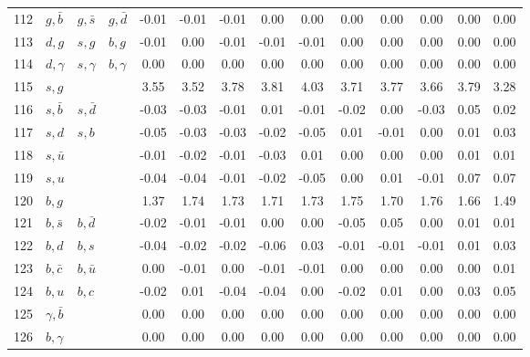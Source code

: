 \begin{tabularx}{\textwidth}{rXXX@{}S@{}S@{}S@{}S@{}S@{}S@{}S@{}S@{}S@{}S}
112 & $g, \bar b$      & $g, \bar s$       & $g, \bar d$      & -0.01 & -0.01 & -0.01 &  0.00 &  0.00 &  0.00 &  0.00 &  0.00 &  0.00 &  0.00 \\
113 & $d, g$           & $s,  g$           & $b,  g$          & -0.01 &  0.00 & -0.01 & -0.01 & -0.01 &  0.00 &  0.00 &  0.00 &  0.00 &  0.00 \\
114 & $d, \gamma$      & $s, \gamma$       & $b, \gamma$      &  0.00 &  0.00 &  0.00 &  0.00 &  0.00 &  0.00 &  0.00 &  0.00 &  0.00 &  0.00 \\
115 & $s, g$           &                   &                  &  3.55 &  3.52 &  3.78 &  3.81 &  4.03 &  3.71 &  3.77 &  3.66 &  3.79 &  3.28 \\
116 & $s, \bar b$      & $s, \bar d$       &                  & -0.03 & -0.03 & -0.01 &  0.01 & -0.01 & -0.02 &  0.00 & -0.03 &  0.05 &  0.02 \\
117 & $s, d$           & $s,  b$           &                  & -0.05 & -0.03 & -0.03 & -0.02 & -0.05 &  0.01 & -0.01 &  0.00 &  0.01 &  0.03 \\
118 & $s, \bar u$      &                   &                  & -0.01 & -0.02 & -0.01 & -0.03 &  0.01 &  0.00 &  0.00 &  0.00 &  0.01 &  0.01 \\
119 & $s, u$           &                   &                  & -0.04 & -0.04 & -0.01 & -0.02 & -0.05 &  0.00 &  0.01 & -0.01 &  0.07 &  0.07 \\
120 & $b, g$           &                   &                  &  1.37 &  1.74 &  1.73 &  1.71 &  1.73 &  1.75 &  1.70 &  1.76 &  1.66 &  1.49 \\
121 & $b, \bar s$      & $b, \bar d$       &                  & -0.02 & -0.01 & -0.01 &  0.00 &  0.00 & -0.05 &  0.05 &  0.00 &  0.01 &  0.01 \\
122 & $b, d$           & $b,  s$           &                  & -0.04 & -0.02 & -0.02 & -0.06 &  0.03 & -0.01 & -0.01 & -0.01 &  0.01 &  0.03 \\
123 & $b, \bar c$      & $b, \bar u$       &                  &  0.00 & -0.01 &  0.00 & -0.01 & -0.01 &  0.00 &  0.00 &  0.00 &  0.00 &  0.01 \\
124 & $b, u$           & $b,  c$           &                  & -0.02 &  0.01 & -0.04 & -0.04 &  0.00 & -0.02 &  0.01 &  0.00 &  0.03 &  0.05 \\
125 & $\gamma, \bar b$ &                   &                  &  0.00 &  0.00 &  0.00 &  0.00 &  0.00 &  0.00 &  0.00 &  0.00 &  0.00 &  0.00 \\
126 & $b, \gamma$      &                   &                  &  0.00 &  0.00 &  0.00 &  0.00 &  0.00 &  0.00 &  0.00 &  0.00 &  0.00 &  0.00 \\

\end{tabularx}
